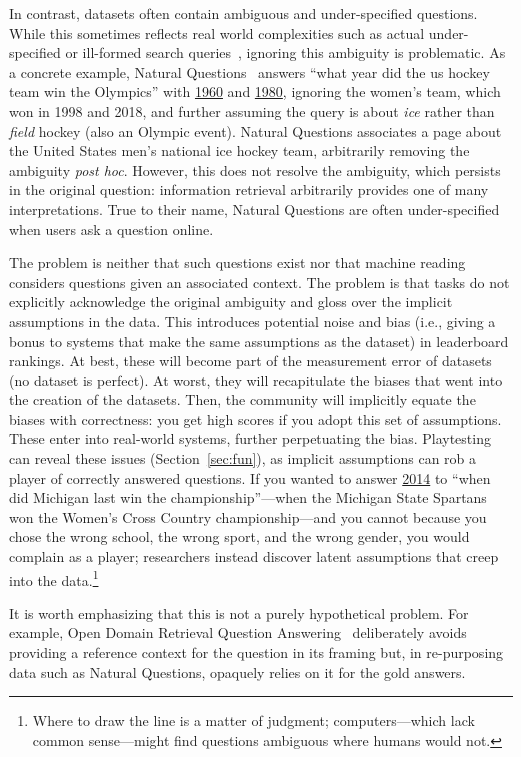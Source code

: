 In contrast, \qa{} datasets often contain ambiguous and
under-specified questions.
While this sometimes reflects real world complexities such as actual
under-specified or ill-formed search
queries~\citep{faruqui-18,kwiatkowski-19}, ignoring this ambiguity is
problematic.
As a concrete example, Natural Questions~\cite{kwiatkowski-19} answers ``what year did the us hockey team win the Olympics'' with \underline{1960} and \underline{1980}, ignoring the  women's team, which won in 1998 and 2018, and further assuming the query is about \emph{ice} rather than \emph{field} hockey (also an Olympic event).
Natural Questions associates a page about the United States men's national ice hockey team, arbitrarily removing the ambiguity \textit{post hoc}.
However, this does not resolve the ambiguity, which persists in the original question: information retrieval arbitrarily provides one of many interpretations.
True to their name, Natural Questions are often under-specified when users ask a question online.

The problem is neither that such questions exist nor that machine
reading  considers questions given an associated context.
The problem is that tasks do not explicitly acknowledge the original
ambiguity and gloss over the implicit assumptions in the data.
This introduces potential noise and bias (i.e., giving a bonus to systems that make
the same assumptions as the dataset) in leaderboard rankings. 
At best, these will become part of
the measurement error of datasets (no dataset is perfect). 
At worst, they will recapitulate the biases that went into the creation of the datasets.
Then, the community will implicitly equate the biases with correctness: you get high scores if you 
adopt this set of assumptions.
These enter into real-world systems, further perpetuating the bias.
Playtesting can reveal these issues (Section~\ref{sec:fun}), as implicit assumptions 
can rob a player of correctly answered questions.
If you wanted to answer \underline{2014} to ``when did Michigan last win the championship''---when the Michigan State Spartans won the Women's Cross Country championship---and you cannot because you chose the wrong school, the wrong sport, and the wrong gender,
you would complain as a player; researchers instead discover latent assumptions that creep into the data.\footnote{Where to draw the line is a matter of judgment; computers---which lack common sense---might find questions ambiguous where humans would not.}

It is worth emphasizing that this is not a purely hypothetical problem. For example, Open Domain Retrieval Question Answering~\cite{lee-19} deliberately avoids providing a reference context for the question in its framing but, in re-purposing data such as Natural Questions, opaquely relies on it for the gold answers.

